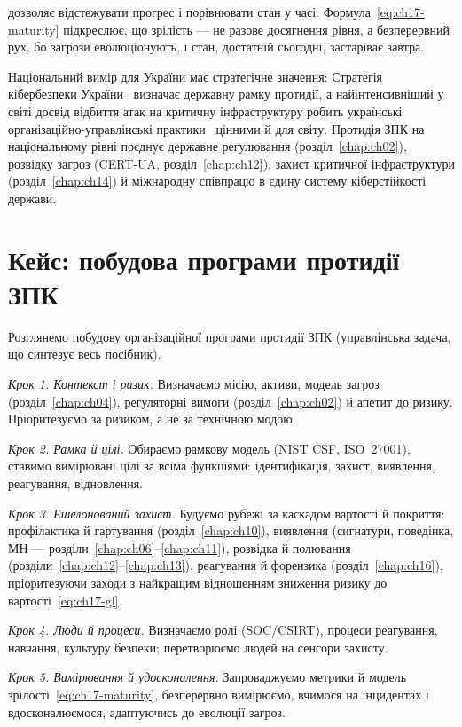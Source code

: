 дозволяє відстежувати прогрес і порівнювати стан у часі. Формула~\eqref{eq:ch17-maturity} підкреслює, що зрілість --- не разове досягнення рівня, а безперервний рух, бо загрози еволюціонують, і стан, достатній сьогодні, застаріває завтра.

Національний вимір для України має стратегічне значення: Стратегія кібербезпеки України~\cite{ch17:strategy-ua} визначає державну рамку протидії, а найінтенсивніший у світі досвід відбиття атак на критичну інфраструктуру робить українські організаційно-управлінські практики~\cite{ch17:governance-ua} цінними й для світу. Протидія ЗПК на національному рівні поєднує державне регулювання (розділ~\ref{chap:ch02}), розвідку загроз (CERT-UA, розділ~\ref{chap:ch12}), захист критичної інфраструктури (розділ~\ref{chap:ch14}) й міжнародну співпрацю в єдину систему кіберстійкості держави.

\section{Кейс: побудова програми протидії ЗПК}\label{sec:ch17-case}

Розглянемо побудову організаційної програми протидії ЗПК (управлінська задача, що синтезує весь посібник).

\emph{Крок 1. Контекст і ризик.} Визначаємо місію, активи, модель загроз (розділ~\ref{chap:ch04}), регуляторні вимоги (розділ~\ref{chap:ch02}) й апетит до ризику. Пріоритезуємо за ризиком, а не за технічною модою.

\emph{Крок 2. Рамка й цілі.} Обираємо рамкову модель (NIST CSF, ISO~27001), ставимо вимірювані цілі за всіма функціями: ідентифікація, захист, виявлення, реагування, відновлення.

\emph{Крок 3. Ешелонований захист.} Будуємо рубежі за каскадом вартості й покриття: профілактика й гартування (розділ~\ref{chap:ch10}), виявлення (сигнатури, поведінка, МН --- розділи~\ref{chap:ch06}--\ref{chap:ch11}), розвідка й полювання (розділи~\ref{chap:ch12}--\ref{chap:ch13}), реагування й форензика (розділ~\ref{chap:ch16}), пріоритезуючи заходи з найкращим відношенням зниження ризику до вартості~\eqref{eq:ch17-gl}.

\emph{Крок 4. Люди й процеси.} Визначаємо ролі (SOC/CSIRT), процеси реагування, навчання, культуру безпеки; перетворюємо людей на сенсори захисту.

\emph{Крок 5. Вимірювання й удосконалення.} Запроваджуємо метрики й модель зрілості~\eqref{eq:ch17-maturity}, безперервно вимірюємо, вчимося на інцидентах і вдосконалюємося, адаптуючись до еволюції загроз.

